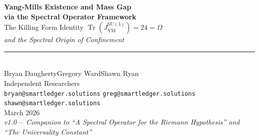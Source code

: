 \documentclass[11pt,a4paper]{article}
\theoremstyle{plain}
\theoremstyle{remark}
\renewcommand{\Omega}{\varOmega}
\newcommand{\Tr}{\operatorname{Tr}}
\newcommand{\SU}{\mathrm{SU}}
\begin{document}
\thispagestyle{empty}


\vspace*{0.5cm}

\begin{center}
  {\fontsize{22}{26}\selectfont\bfseries\color{accent}
   Yang-Mills Existence and Mass Gap\\[2pt]
   via the Spectral Operator Framework}\\[10pt]
  {\large\color{accentlight}
   The Killing Form Identity $\Tr(J_{\mathrm{YM}}^{\SU(3)}) = 24 = \Omega$\\[2pt]
   \itshape and the Spectral Origin of Confinement}\\[20pt]
  {\color{titlegold}\rule{6cm}{0.8pt}}\\[20pt]
  {\Large Bryan Daugherty\qquad Gregory Ward\qquad Shawn Ryan}\\[8pt]
  {\small\color{subtlegray}
    Independent Researchers\\[4pt]
    \texttt{bryan@smartledger.solutions}\quad
    \texttt{greg@smartledger.solutions}\quad
    \texttt{shawn@smartledger.solutions}}\\[16pt]
  {\normalsize\color{subtlegray} March 2026}\\[6pt]
  {\small\color{subtlegray}\itshape v1.0\enspace---\enspace
    Companion to ``A Spectral Operator for the Riemann Hypothesis'' \cite{DHR2026a}
    and ``The Universality Constant'' \cite{DHR2026b}}
\end{center}

\vspace{14pt}

\noindent
{}

\vspace{10pt}
\end{document}
